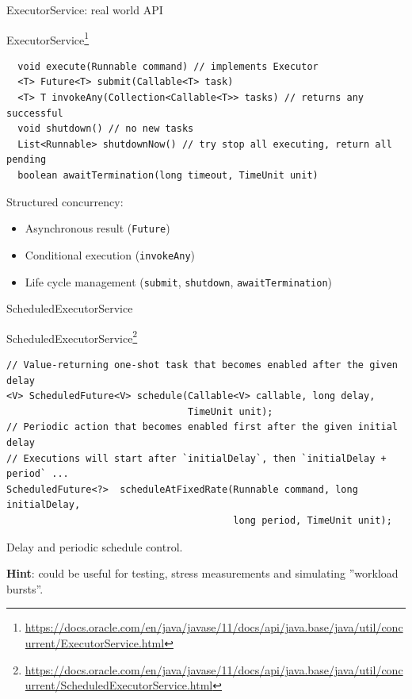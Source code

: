 \begin{frame}[fragile]{ExecutorService: real world API}

ExecutorService\footnote{\tiny\url{https://docs.oracle.com/en/java/javase/11/docs/api/java.base/java/util/concurrent/ExecutorService.html}}

\begin{verbatim}
  void execute(Runnable command) // implements Executor
  <T> Future<T> submit(Callable<T> task)   
  <T> T invokeAny(Collection<Callable<T>> tasks) // returns any successful
  void shutdown() // no new tasks
  List<Runnable> shutdownNow() // try stop all executing, return all pending
  boolean awaitTermination(long timeout, TimeUnit unit)
\end{verbatim}

Structured concurrency:
\begin{itemize}
    \item Asynchronous result (\texttt{Future})
    \item Conditional execution (\texttt{invokeAny})
    \item Life cycle management (\texttt{submit}, \texttt{shutdown}, \texttt{awaitTermination})
\end{itemize}

\end{frame}


\begin{frame}[fragile]{ScheduledExecutorService}

ScheduledExecutorService\footnote{\tiny\url{https://docs.oracle.com/en/java/javase/11/docs/api/java.base/java/util/concurrent/ScheduledExecutorService.html}}

\begin{verbatim}
// Value-returning one-shot task that becomes enabled after the given delay
<V> ScheduledFuture<V> schedule(Callable<V> callable, long delay, 
                                TimeUnit unit);
// Periodic action that becomes enabled first after the given initial delay 
// Executions will start after `initialDelay`, then `initialDelay + period` ...
ScheduledFuture<?>  scheduleAtFixedRate(Runnable command, long initialDelay, 
                                        long period, TimeUnit unit);
\end{verbatim}

Delay and periodic schedule control.

\textbf{Hint}: could be useful for testing, stress measurements and simulating ''workload bursts''.
\end{frame}


